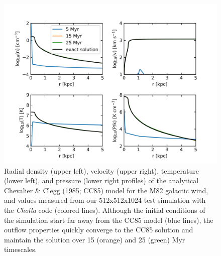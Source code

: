 \documentclass[11pt,letterpaper,english]{article}
\begin{document}
\begin{figure}[H]
\centering
\includegraphics[width=0.8\linewidth]{CC85.png}
\caption{Radial density (upper left), velocity (upper right), temperature (lower left), and pressure (lower right profiles) of the analytical Chevalier \& Clegg (1985; CC85) model for the M82 galactic wind, and values measured from our 512x512x1024 test simulation with the \textit{Cholla} code (colored lines). 
Although the initial conditions of the simulation start far away from the CC85 model (blue lines), the
outflow properties quickly converge to the CC85 solution and maintain the solution over
15 (orange) and 25 (green) Myr timescales.}
\label{fig:CC85}
\end{figure}
\end{document}
